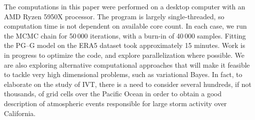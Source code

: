 
The computations in this paper were performed on a desktop computer with an 
    AMD Ryzen 5950X processor. The program is largely single-threaded, so 
    computation time is not dependent on available core count.  In each case, 
    we run the MCMC chain for 50\,000 iterations, with a burn-in of 40\,000 
    samples.  Fitting the PG--G model on the ERA5 dataset took approximately 
    15 minutes.  Work is in progress to optimize the code, and explore 
    parallelization where possible.  We are also exploring alternative 
    computational approaches that will make it feasible to tackle very high 
    dimensional problems, such as variational Bayes. In fact, to elaborate on 
    the study of IVT, there is a need to consider several hundreds, if not thousands, 
    of grid cells over the Pacific Ocean in order to obtain a good description of 
    atmospheric  events responsible for large storm activity over California.  



